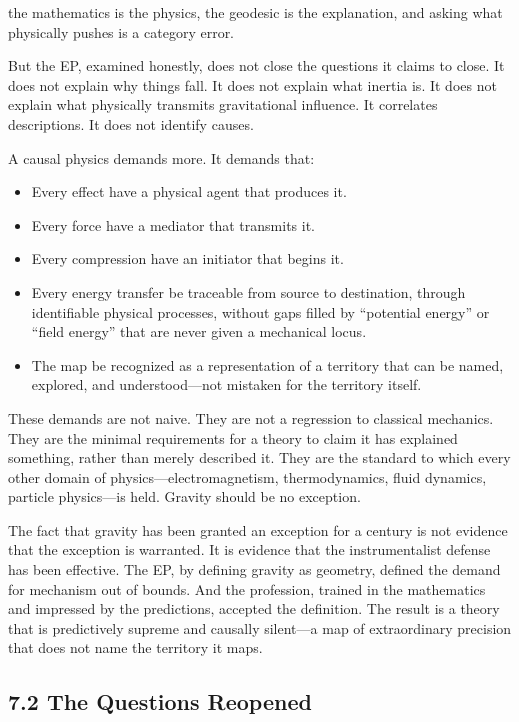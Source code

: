 \documentclass[11pt]{article}
\begin{document}
the mathematics is the physics, the geodesic is the explanation, and asking what physically pushes is a category error.

But the EP, examined honestly, does not close the questions it claims to close. It does not explain why things fall. It does not explain what inertia is. It does not explain what physically transmits gravitational influence. It correlates descriptions. It does not identify causes.

A causal physics demands more. It demands that:

\begin{itemize}
\item
  Every effect have a physical agent that produces it.
\item
  Every force have a mediator that transmits it.
\item
  Every compression have an initiator that begins it.
\item
  Every energy transfer be traceable from source to destination, through identifiable physical processes, without gaps filled by ``potential energy'' or ``field energy'' that are never given a mechanical locus.
\item
  The map be recognized as a representation of a territory that can be named, explored, and understood---not mistaken for the territory itself.
\end{itemize}

These demands are not naive. They are not a regression to classical mechanics. They are the minimal requirements for a theory to claim it has explained something, rather than merely described it. They are the standard to which every other domain of physics---electromagnetism, thermodynamics, fluid dynamics, particle physics---is held. Gravity should be no exception.

The fact that gravity has been granted an exception for a century is not evidence that the exception is warranted. It is evidence that the instrumentalist defense has been effective. The EP, by defining gravity as geometry, defined the demand for mechanism out of bounds. And the profession, trained in the mathematics and impressed by the predictions, accepted the definition. The result is a theory that is predictively supreme and causally silent---a map of extraordinary precision that does not name the territory it maps.

\subsection{7.2 The Questions Reopened}
\end{document}
